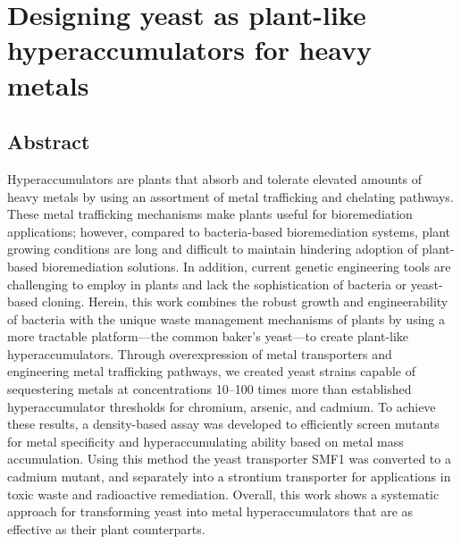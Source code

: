 \documentclass[../main/main]{subfiles}
\begin{document}
\chapter{Designing yeast as plant-like hyperaccumulators for heavy metals}
\label{chapter3}
\renewcommand{\figurename}{Figure}

\section*{Abstract}
Hyperaccumulators are plants that absorb and tolerate elevated amounts of heavy metals by using an assortment of metal trafficking and chelating pathways. These metal trafficking mechanisms make plants useful for bioremediation applications; however, compared to bacteria-based bioremediation systems, plant growing conditions are long and difficult to maintain hindering adoption of plant-based bioremediation solutions. In addition, current genetic engineering tools are challenging to employ in plants and lack the sophistication of bacteria or yeast-based cloning. Herein, this work combines the robust growth and engineerability of bacteria with the unique waste management mechanisms of plants by using a more tractable platform---the common baker's yeast---to create plant-like hyperaccumulators. Through overexpression of metal transporters and engineering metal trafficking pathways, we created yeast strains capable of sequestering metals at concentrations 10--100 times more than established hyperaccumulator thresholds for chromium, arsenic, and cadmium. To achieve these results, a density-based assay was developed to efficiently screen mutants for metal specificity and hyperaccumulating ability based on metal mass accumulation. Using this method the yeast transporter SMF1 was converted to a cadmium mutant, and separately into a strontium transporter for applications in toxic waste and radioactive  remediation. Overall, this work shows a systematic approach for transforming yeast into metal hyperaccumulators that are as effective as their plant counterparts.

\end{document}
